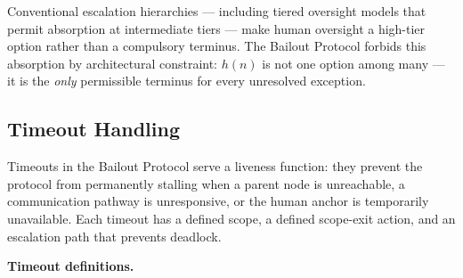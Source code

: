 Conventional escalation hierarchies --- including tiered oversight models that permit absorption at intermediate tiers --- make human oversight a high-tier option rather than a compulsory terminus. The Bailout Protocol forbids this absorption by architectural constraint: $h(n)$ is not one option among many --- it is the \emph{only} permissible terminus for every unresolved exception.

\subsection{Timeout Handling}\label{sec:bailout-timeouts}

Timeouts in the Bailout Protocol serve a liveness function: they prevent the protocol from permanently stalling when a parent node is unreachable, a communication pathway is unresponsive, or the human anchor is temporarily unavailable. Each timeout has a defined scope, a defined scope-exit action, and an escalation path that prevents deadlock.

\bigskip
\noindent\textbf{Timeout definitions.}

